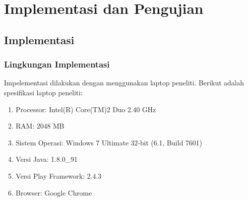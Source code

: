 \chapter{Implementasi dan Pengujian}
\label{chap:implementasipengujian}

\section{Implementasi}
\label{sec:implementasi}

\subsection{Lingkungan Implementasi}
\label{sec:lingkunganimplementasi}
Impelementasi dilakukan dengan menggunakan laptop peneliti. Berikut adalah spesifikasi laptop peneliti:
\begin{enumerate}
	\item Processor: Intel(R) Core(TM)2 Duo 2.40 GHz
	\item RAM: 2048 MB
	\item Sistem Operasi: Windows 7 Ultimate 32-bit (6.1, Build 7601)
	\item Versi Java: 1.8.0\_91
	\item Versi Play Framework: 2.4.3
	\item Browser: Google Chrome
\end{enumerate}

